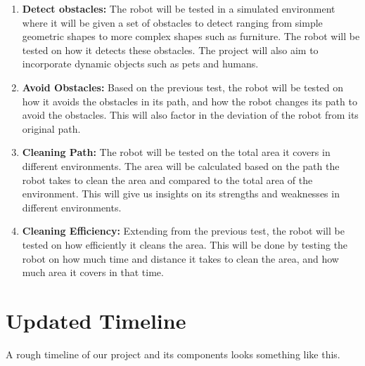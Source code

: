 \documentclass[12pt]{article}
\begin{document}
\begin{enumerate}
    \item \textbf{Detect obstacles:} The robot will be tested in a simulated environment where it will be given a set of
          obstacles to detect ranging from simple geometric shapes to more complex
          shapes such as furniture. The robot will be tested on how it detects these
          obstacles. The project will also aim to incorporate dynamic objects such as pets and humans.

    \item \textbf{Avoid Obstacles:} Based on the previous test, the robot will be
          tested on how it avoids the obstacles in its path, and how the robot
          changes its path to avoid the obstacles. This will also factor in the
          deviation of the robot from its original path.

    \item \textbf{Cleaning Path:} The robot will be tested on the total area it
          covers in different environments. The area will be calculated based on the
          path the robot takes to clean the area and compared to the total area of
          the environment. This will give us insights on its
          strengths and weaknesses in different environments.

    \item \textbf{Cleaning Efficiency:} Extending from the previous test, the
          robot will be tested on how efficiently it cleans the area. This will
          be done by testing the robot on how much time and distance it takes to clean the
          area, and how much area it covers in that time.
\end{enumerate}

\section{Updated Timeline}
A rough timeline of our project and its components looks something like this.
\end{document}
